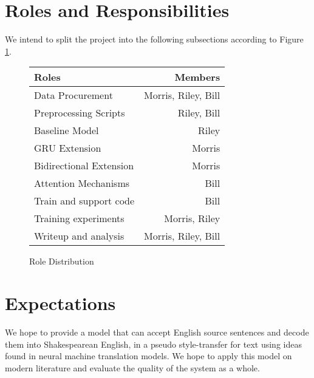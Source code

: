 \documentclass[twoside,twocolumn]{article}
\begin{document}
\section{Roles and Responsibilities}
We intend to split the project into the following subsections according to
Figure \ref{fig:roles}.

\begin{figure}
  \centering
  \begin{tabular}{ |l|r| }
      \hline
      \textbf{Roles} & \textbf{Members} \\
      \hline
      Data Procurement & Morris, Riley, Bill \\ \hline
      Preprocessing Scripts & Riley, Bill \\ \hline
      Baseline Model & Riley \\ \hline
      GRU Extension & Morris \\ \hline
      Bidirectional Extension & Morris \\ \hline
      Attention Mechanisms & Bill \\ \hline
      Train and support code & Bill \\ \hline
      Training experiments & Morris, Riley \\ \hline
      Writeup and analysis & Morris, Riley, Bill \\ \hline
  \end{tabular}
  \caption{Role Distribution}
  \label{fig:roles}
\end{figure}

\section{Expectations}
We hope to provide a model that can accept English source sentences and decode
them into Shakespearean English, in a pseudo style-transfer for text using ideas
found in neural machine translation models. We hope to apply this model on
modern literature and evaluate the quality of the system as a whole.



\end{document}
